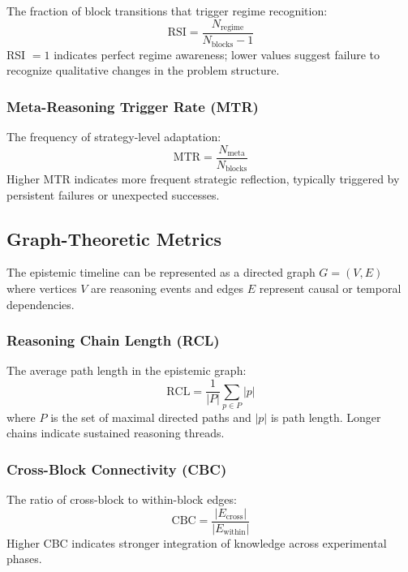 \documentclass[10pt,twocolumn]{article}
\begin{document}
The fraction of block transitions that trigger regime recognition:
\begin{equation}
    \text{RSI} = \frac{N_{\text{regime}}}{N_{\text{blocks}} - 1}
\end{equation}
RSI $= 1$ indicates perfect regime awareness; lower values suggest failure to recognize qualitative changes in the problem structure.

\subsubsection{Meta-Reasoning Trigger Rate (MTR)}

The frequency of strategy-level adaptation:
\begin{equation}
    \text{MTR} = \frac{N_{\text{meta}}}{N_{\text{blocks}}}
\end{equation}
Higher MTR indicates more frequent strategic reflection, typically triggered by persistent failures or unexpected successes.

\subsection{Graph-Theoretic Metrics}

The epistemic timeline can be represented as a directed graph $G = (V, E)$ where vertices $V$ are reasoning events and edges $E$ represent causal or temporal dependencies.

\subsubsection{Reasoning Chain Length (RCL)}

The average path length in the epistemic graph:
\begin{equation}
    \text{RCL} = \frac{1}{|P|} \sum_{p \in P} |p|
\end{equation}
where $P$ is the set of maximal directed paths and $|p|$ is path length. Longer chains indicate sustained reasoning threads.

\subsubsection{Cross-Block Connectivity (CBC)}

The ratio of cross-block to within-block edges:
\begin{equation}
    \text{CBC} = \frac{|E_{\text{cross}}|}{|E_{\text{within}}|}
\end{equation}
Higher CBC indicates stronger integration of knowledge across experimental phases.
\end{document}
